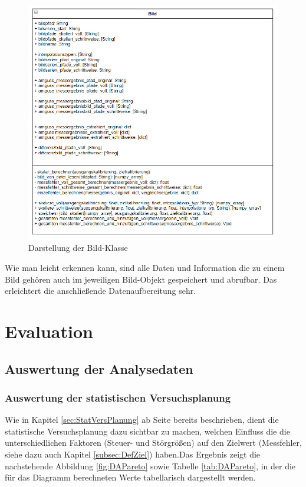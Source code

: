 \documentclass[
fontsize=10pt, 
listof = totoc,
parskip = half	
]{report}
\begin{document}
\begin{figure}[H]
	\centering
	\includegraphics[scale=0.6]{pics/class_image}
	\caption{Darstellung der Bild-Klasse}
	\label{fig:KlasseBild}
\end{figure}

\noindent Wie man leicht erkennen kann, sind alle Daten und Information die zu einem Bild gehören auch im jeweiligen Bild-Objekt gespeichert und abrufbar. Das erleichtert die anschließende Datenaufbereitung sehr.


\chapter{Evaluation}
\label{ch:Evaluation}

\section{Auswertung der Analysedaten}
\label{sec:AuswertungAnalysedaten}

\subsection{Auswertung der statistischen Versuchsplanung}
\label{subsubsec:AuswertungStatVpl}
Wie in Kapitel \ref{sec:StatVersPlanung} ab Seite \pageref{sec:StatVersPlanung} bereits beschrieben, dient die statistische Versuchsplanung dazu sichtbar zu machen, welchen Einfluss die die unterschiedlichen Faktoren (Steuer- und Störgrößen) auf den Zielwert (Messfehler, siehe dazu auch Kapitel \ref{subsec:DefZiel}) haben.Das Ergebnis zeigt die nachstehende Abbildung \ref{fig:DAPareto} sowie Tabelle \ref{tab:DAPareto}, in der die für das Diagramm berechneten Werte tabellarisch dargestellt werden. 
\end{document}
